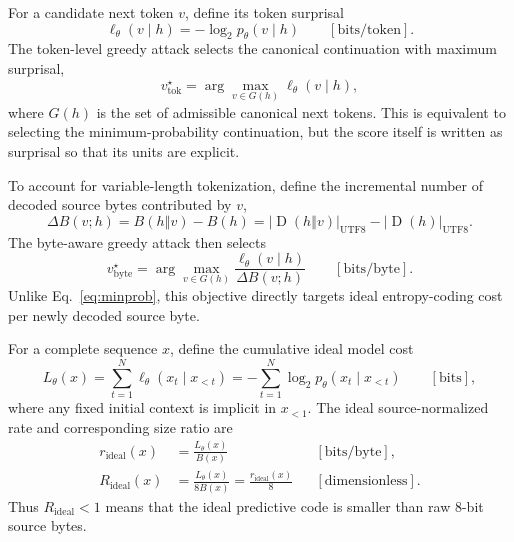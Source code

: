 \documentclass{article}
\newcommand{\bytes}[1]{\lvert #1\rvert_{\mathrm{UTF8}}}
\newcommand{\Dec}{\operatorname{D}}
\begin{document}
For a candidate next token $v$, define its token surprisal
\begin{equation}
  \ell_\theta(v\mid h)
  = -\log_2 p_\theta(v\mid h)
  \qquad [\mathrm{bits/token}].
  \label{eq:token-surprisal}
\end{equation}
The token-level greedy attack selects the canonical continuation with maximum surprisal,
\begin{equation}
  v^\star_{\mathrm{tok}}
  = \arg\max_{v\in G(h)} \ell_\theta(v\mid h),
  \label{eq:minprob}
\end{equation}
where $G(h)$ is the set of admissible canonical next tokens. This is equivalent to selecting the minimum-probability continuation, but the score itself is written as surprisal so that its units are explicit.

To account for variable-length tokenization, define the incremental number of decoded source bytes contributed by $v$,
\begin{equation}
  \Delta B(v;h)
  =
  B(h\mathbin\Vert v)-B(h)
  =
  \bytes{\Dec(h\mathbin\Vert v)}-\bytes{\Dec(h)}.
  \label{eq:delta-bytes}
\end{equation}
The byte-aware greedy attack then selects
\begin{equation}
  v^\star_{\mathrm{byte}}
  =
  \arg\max_{v\in G(h)}
  \frac{\ell_\theta(v\mid h)}{\Delta B(v;h)}
  \qquad [\mathrm{bits/byte}].
  \label{eq:spb}
\end{equation}
Unlike Eq.~\ref{eq:minprob}, this objective directly targets ideal entropy-coding cost per newly decoded source byte.

For a complete sequence $x$, define the cumulative ideal model cost
\begin{equation}
  L_\theta(x)
  =
  \sum_{t=1}^{N}
  \ell_\theta(x_t\mid x_{<t})
  =
  -\sum_{t=1}^{N}\log_2 p_\theta(x_t\mid x_{<t})
  \qquad [\mathrm{bits}],
  \label{eq:nll}
\end{equation}
where any fixed initial context is implicit in $x_{<1}$. The ideal source-normalized rate and corresponding size ratio are
\begin{align}
  r_{\mathrm{ideal}}(x)
  &= \frac{L_\theta(x)}{B(x)}
  &&[\mathrm{bits/byte}], \label{eq:ideal-bpb}\\
  R_{\mathrm{ideal}}(x)
  &= \frac{L_\theta(x)}{8B(x)}
  =\frac{r_{\mathrm{ideal}}(x)}{8}
  &&[\text{dimensionless}]. \label{eq:ideal-ratio}
\end{align}
Thus $R_{\mathrm{ideal}}<1$ means that the ideal predictive code is smaller than raw 8-bit source bytes.
\end{document}
